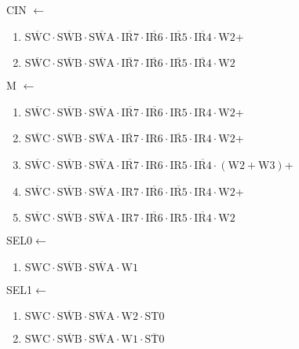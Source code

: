 \documentclass[UTF8]{ctexart}
\begin{document}
CIN $\leftarrow$
\begin{enumerate}[\indent\indent]
	\item $\overline{\text{SWC}} \cdot\overline{\text{SWB}}\cdot \overline{\text{SWA}} \cdot \overline{\text{IR7}} \cdot \overline{\text{IR6}} \cdot \overline{\text{IR5}} \cdot \overline{\text{IR4} }\cdot \text{W2}$+
	\item $\overline{\text{SWC}} \cdot\overline{\text{SWB}}\cdot \overline{\text{SWA}} \cdot \overline{\text{IR7}} \cdot \overline{\text{IR6}} \cdot \overline{\text{IR5}} \cdot \overline{\text{IR4}} \cdot \text{W2}$
\end{enumerate}
M $\leftarrow$
\begin{enumerate}[\indent\indent]
	\item $\overline{\text{SWC}} \cdot\overline{\text{SWB}}\cdot \overline{\text{SWA}} \cdot \overline{\text{IR7}} \cdot \overline{\text{IR6}} \cdot \text{IR5} \cdot \text{IR4} \cdot \text{W2}$+
	\item $\overline{\text{SWC}} \cdot\overline{\text{SWB}}\cdot \overline{\text{SWA}} \cdot \overline{\text{IR7}} \cdot \text{IR6} \cdot \overline{\text{IR5}} \cdot \text{IR4} \cdot \text{W2}$+
	\item $\overline{\text{SWC}} \cdot\overline{\text{SWB}}\cdot \overline{\text{SWA}} \cdot \overline{\text{IR7}} \cdot \text{IR6} \cdot \text{IR5} \cdot \overline{\text{IR4}} \cdot (\text{W2} + \text{W3})$+
	\item $\overline{\text{SWC}} \cdot\overline{\text{SWB}}\cdot \overline{\text{SWA}} \cdot \text{IR7} \cdot \overline{\text{IR6}} \cdot \overline{\text{IR5}} \cdot \text{IR4} \cdot \text{W2}$+
	\item $\overline{\text{SWC}} \cdot\overline{\text{SWB}}\cdot \overline{\text{SWA}} \cdot \text{IR7} \cdot \overline{\text{IR6}} \cdot \text{IR5} \cdot \overline{\text{IR4}} \cdot \text{W2}$
\end{enumerate}
SEL0$\leftarrow$
\begin{enumerate}[\indent\indent]
	\item$\text{SWC}\cdot\overline{\text{SWB}}\cdot\overline{\text{SWA}}\cdot\text{W1}$
\end{enumerate}
SEL1$\leftarrow$
\begin{enumerate}[\indent\indent]
	\item$\text{SWC}\cdot\overline{\text{SWB}}\cdot\overline{\text{SWA}}\cdot\text{W2}\cdot\text{ST0}$
	\item$\text{SWC}\cdot\overline{\text{SWB}}\cdot\overline{\text{SWA}}\cdot\text{W1}\cdot\overline{\text{ST0}}$
\end{enumerate}
\end{document}
